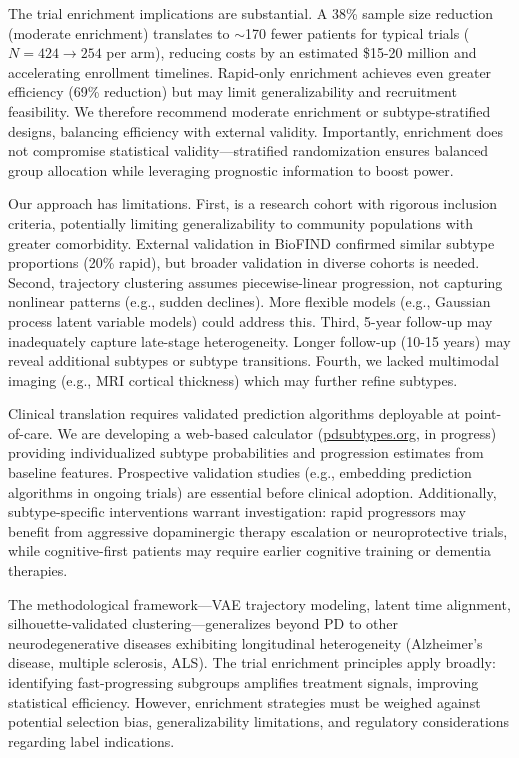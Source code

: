 The trial enrichment implications are substantial. A 38\% sample size reduction (moderate enrichment) translates to $\sim$170 fewer patients for typical trials ($N=424\to 254$ per arm), reducing costs by an estimated \$15-20 million and accelerating enrollment timelines. Rapid-only enrichment achieves even greater efficiency (69\% reduction) but may limit generalizability and recruitment feasibility. We therefore recommend moderate enrichment or subtype-stratified designs, balancing efficiency with external validity. Importantly, enrichment does not compromise statistical validity—stratified randomization ensures balanced group allocation while leveraging prognostic information to boost power\cite{kernan1999stratified}.

Our approach has limitations. First, \ppmi{} is a research cohort with rigorous inclusion criteria, potentially limiting generalizability to community populations with greater comorbidity. External validation in BioFIND confirmed similar subtype proportions (20\% rapid), but broader validation in diverse cohorts is needed. Second, trajectory clustering assumes piecewise-linear progression, not capturing nonlinear patterns (e.g., sudden declines). More flexible models (e.g., Gaussian process latent variable models\cite{fortuin2020gp}) could address this. Third, 5-year follow-up may inadequately capture late-stage heterogeneity. Longer follow-up (10-15 years) may reveal additional subtypes or subtype transitions\cite{Post2018}. Fourth, we lacked multimodal imaging (e.g., MRI cortical thickness) which may further refine subtypes\cite{zeighami2019network}.

Clinical translation requires validated prediction algorithms deployable at point-of-care. We are developing a web-based calculator (\url{pdsubtypes.org}, in progress) providing individualized subtype probabilities and progression estimates from baseline features. Prospective validation studies (e.g., embedding prediction algorithms in ongoing trials) are essential before clinical adoption. Additionally, subtype-specific interventions warrant investigation: rapid progressors may benefit from aggressive dopaminergic therapy escalation or neuroprotective trials, while cognitive-first patients may require earlier cognitive training or dementia therapies.

The methodological framework—VAE trajectory modeling, latent time alignment, silhouette-validated clustering—generalizes beyond PD to other neurodegenerative diseases exhibiting longitudinal heterogeneity (Alzheimer's disease\cite{young2018longitudinal}, multiple sclerosis\cite{galea2018machine}, ALS\cite{westeneng2018prognosis}). The trial enrichment principles apply broadly: identifying fast-progressing subgroups amplifies treatment signals, improving statistical efficiency. However, enrichment strategies must be weighed against potential selection bias, generalizability limitations, and regulatory considerations regarding label indications.

